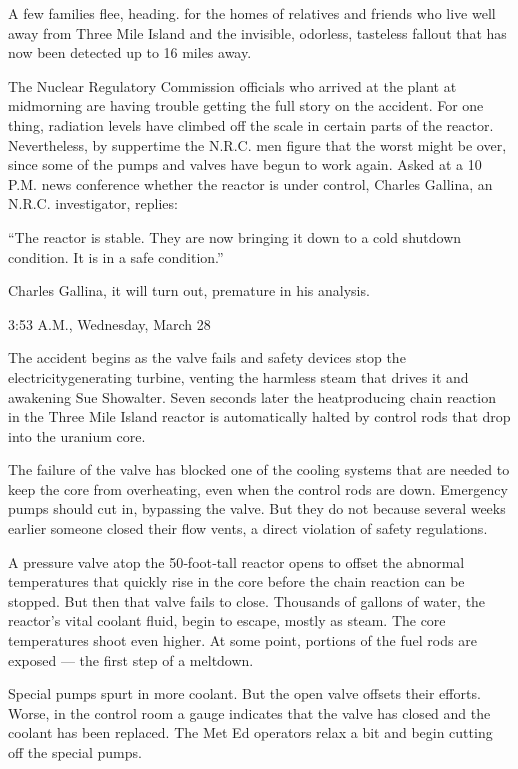 A few families flee, heading. for the homes of relatives and friends who
live well away from Three Mile Island and the invisible, odorless,
tasteless fallout that has now been detected up to 16 miles away.

The Nuclear Regulatory Commission officials who arrived at the plant at
midmorning are having trouble getting the full story on the accident.
For one thing, radiation levels have climbed off the scale in certain
parts of the reactor. Nevertheless, by suppertime the N.R.C. men figure
that the worst might be over, since some of the pumps and valves have
begun to work again. Asked at a 10 P.M. news conference whether the
reactor is under control, Charles Gallina, an N.R.C. investigator,
replies:

``The reactor is stable. They are now bringing it down to a cold
shutdown condition. It is in a safe condition.''

Charles Gallina, it will turn out, premature in his analysis.

3:53 A.M., Wednesday, March 28

The accident begins as the valve fails and safety devices stop the
electricitygenerating turbine, venting the harmless steam that drives it
and awakening Sue Showalter. Seven seconds later the heatproducing chain
reaction in the Three Mile Island reactor is automatically halted by
control rods that drop into the uranium core.

The failure of the valve has blocked one of the cooling systems that are
needed to keep the core from overheating, even when the control rods are
down. Emergency pumps should cut in, bypassing the valve. But they do
not because several weeks earlier someone closed their flow vents, a
direct violation of safety regulations.

A pressure valve atop the 50‐foot‐tall reactor opens to offset the
abnormal temperatures that quickly rise in the core before the chain
reaction can be stopped. But then that valve fails to close. Thousands
of gallons of water, the reactor's vital coolant fluid, begin to escape,
mostly as steam. The core temperatures shoot even higher. At some point,
portions of the fuel rods are exposed --- the first step of a meltdown.

Special pumps spurt in more coolant. But the open valve offsets their
efforts. Worse, in the control room a gauge indicates that the valve has
closed and the coolant has been replaced. The Met Ed operators relax a
bit and begin cutting off the special pumps.

